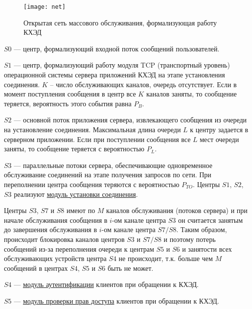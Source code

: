 \begin{figure}[h]
  \centering
  \texttt{[image: net]}
  \caption{Открытая сеть массового обслуживания, формализующая работу КХЭД}
  \label{img:net}
\end{figure}

$S0$ --- центр, формализующий входной поток сообщений пользователей.

\vspace{\baselineskip}
$S1$ --- центр, формализующий работу модуля TCP (транспортный уровень) операционной системы сервера приложений КХЭД на этапе установления соединения. $K$ – число обслуживающих каналов, очередь отсутствует. Если в момент поступления сообщения в центр все $K$ каналов заняты, то сообщение теряется, вероятность этого события равна $P_B$.

\vspace{\baselineskip}
$S2$ --- основной поток приложения сервера, извлекающего сообщения из очереди на установление соединения. Максимальная длина очереди $L$ к центру задается в серверном приложении. Если при поступлении сообщения все $L$ мест очереди заняты, то сообщение теряется с вероятностью $P_L$.

\vspace{\baselineskip}
$S3$ --- параллельные потоки сервера, обеспечивающие одновременное обслуживание соединений на этапе получения запросов по сети. При переполнении центра сообщения теряются с вероятностью $P_{TO}$.
Центры $S1$, $S2$, $S3$ реализуют \underline{модуль установки соединения}.

\vspace{\baselineskip}
Центры $S3$, $S7$ и $S8$ имеют по $M$ каналов обслуживания (потоков сервера) и при начале обслуживания сообщения в $i$-ом канале центра $S3$ он считается занятым до завершения обслуживания в $i$-ом канале центра $S7/S8$. Таким образом, происходит блокировка каналов центров $S3$ и $S7/S8$ и поэтому потерь сообщений из-за переполнения очереди к центрам $S5$ и $S6$ и занятости всех обслуживающих устройств центра $S4$ не происходит, т.к. больше чем $M$ сообщений в центрах $S4$, $S5$ и $S6$ быть не может.

\vspace{\baselineskip}
$S4$ --- \underline{модуль аутентификации} клиентов при обращении к КХЭД.

\vspace{\baselineskip}
$S5$ --- \underline{модуль проверки прав доступа} клиентов при обращении к КХЭД.

